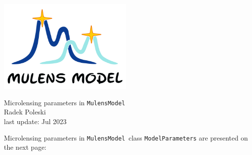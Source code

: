 \documentclass[12pt]{article}
\newcommand\MM{{\tt MulensModel}}
\begin{document}

\begin{center}
\includegraphics[width=0.5\textwidth]{logo/logoMM_crop_4_744x520.png}
\end{center}

\vspace*{3cm}

\begin{center}
{\LARGE Microlensing parameters in \MM}\\
\bigskip
Radek Poleski\\
last update: Jul 2023
\end{center}

\bigskip
Microlensing parameters in \MM\, class {\tt ModelParameters} are presented on the next page:
\end{document}
